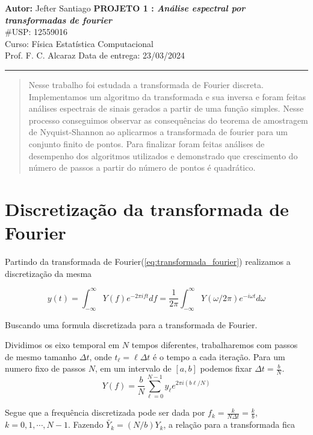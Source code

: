 \documentclass[a4paper, 11pt]{article}
\begin{document}
\noindent
\large\textbf{Autor:} Jefter Santiago \hfill \textbf{PROJETO 1 : {\color{blue} \emph{Análise espectral por transformadas de fourier}}}   \\
\#USP: 12559016 \\
\normalsize Curso: Física Estatística Computacional \\
Prof. F. C. Alcaraz \hfill Data de entrega: 23/03/2024 \\
\noindent\rule{7in}{2.8pt}

\begin{abstract}
  Nesse trabalho foi estudada a transformada de Fourier discreta. Implementamos um algoritmo
  da transformada e sua inversa e foram feitas análises espectrais de sinais gerados a partir
  de uma função simples. Nesse processo conseguimos observar as consequências do teorema de
  amostragem de Nyquist-Shannon ao aplicarmos a transformada de fourier para um conjunto finito
  de pontos. Para finalizar foram feitas análises de desempenho dos algoritmos utilizados
  e demonstrado que crescimento do número de passos a partir do número de pontos é quadrático.
\end{abstract}

\section{Discretização da transformada de Fourier}

Partindo da transformada de Fourier(\ref{eq:transformada_fourier}) realizamos a discretização
da mesma

\begin{equation}
  y(t) = \int_{-\infty}^{\infty}Y(f) e^{-2\pi i f t} df = \frac{1}{2\pi}\int_{-\infty}^{\infty} Y(\omega/2\pi) e^{-i\omega t} d \omega
  \label{eq:transformada_fourier}
\end{equation}



Buscando uma formula discretizada para a transformada de Fourier.

Dividimos os eixo temporal em $N$ tempos diferentes, trabalharemos
com passos de mesmo tamanho \( \Delta t \), onde \( t_\ell = \ell \Delta t \) é o tempo
a cada iteração. Para um numero fixo de passos $N$, em um intervalo
de \( [a, b] \) podemos fixar \( \Delta t = \frac{b}{N} \).
\[
  Y(f) = \frac{b}{N}  \sum_{\ell= 0}^{N - 1} y_\ell e^{2 \pi i(b\ell/N)}
\]

Segue que a frequência discretizada pode ser dada por \( f_k = \frac{k}{N\Delta t} = \frac{k}{b}\), \( k = 0, 1, \cdots , N-1
\). Fazendo \( \tilde{Y_k} = \left( N/b \right) Y_k \), a relação
para a transformada fica
\end{document}
